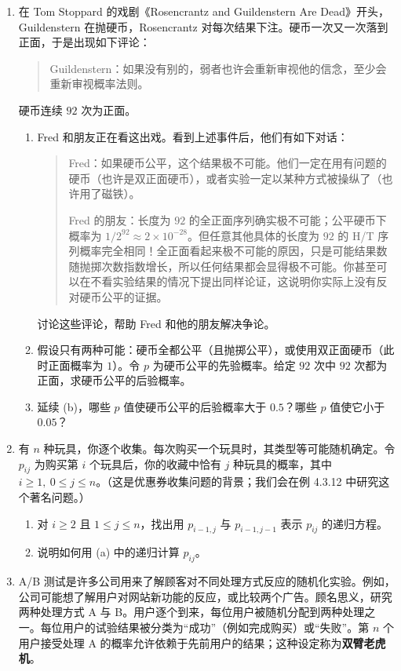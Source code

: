 \documentclass[UTF8, 12pt, fontset=fandol, oneside]{ctexart}
\begin{document}
\begin{enumerate}
  \item 在 Tom Stoppard 的戏剧《Rosencrantz and Guildenstern Are Dead》开头，Guildenstern 在抛硬币，Rosencrantz 对每次结果下注。硬币一次又一次落到正面，于是出现如下评论：
  \begin{quote}
  Guildenstern：如果没有别的，弱者也许会重新审视他的信念，至少会重新审视概率法则。
  \end{quote}
  硬币连续 $92$ 次为正面。
  \begin{enumerate}
    \item Fred 和朋友正在看这出戏。看到上述事件后，他们有如下对话：
    \begin{quote}
    Fred：如果硬币公平，这个结果极不可能。他们一定在用有问题的硬币（也许是双正面硬币），或者实验一定以某种方式被操纵了（也许用了磁铁）。

    Fred 的朋友：长度为 $92$ 的全正面序列确实极不可能；公平硬币下概率为 $1/2^{92}\approx 2\times 10^{-28}$。但任意其他具体的长度为 $92$ 的 H/T 序列概率完全相同！全正面看起来极不可能的原因，只是可能结果数随抛掷次数指数增长，所以任何结果都会显得极不可能。你甚至可以在不看实验结果的情况下提出同样论证，这说明你实际上没有反对硬币公平的证据。
    \end{quote}
    讨论这些评论，帮助 Fred 和他的朋友解决争论。
    \item 假设只有两种可能：硬币全都公平（且抛掷公平），或使用双正面硬币（此时正面概率为 $1$）。令 $p$ 为硬币公平的先验概率。给定 $92$ 次中 $92$ 次都为正面，求硬币公平的后验概率。
    \item 延续 (b)，哪些 $p$ 值使硬币公平的后验概率大于 $0.5$？哪些 $p$ 值使它小于 $0.05$？
  \end{enumerate}

  \item 有 $n$ 种玩具，你逐个收集。每次购买一个玩具时，其类型等可能随机确定。令 $p_{ij}$ 为购买第 $i$ 个玩具后，你的收藏中恰有 $j$ 种玩具的概率，其中 $i\ge 1,\ 0\le j\le n$。（这是优惠券收集问题的背景；我们会在例 4.3.12 中研究这个著名问题。）
  \begin{enumerate}
    \item 对 $i\ge 2$ 且 $1\le j\le n$，找出用 $p_{i-1,j}$ 与 $p_{i-1,j-1}$ 表示 $p_{ij}$ 的递归方程。
    \item 说明如何用 (a) 中的递归计算 $p_{ij}$。
  \end{enumerate}

  \item A/B 测试是许多公司用来了解顾客对不同处理方式反应的随机化实验。例如，公司可能想了解用户对网站新功能的反应，或比较两个广告。顾名思义，研究两种处理方式 A 与 B。用户逐个到来，每位用户被随机分配到两种处理之一。每位用户的试验结果被分类为“成功”（例如完成购买）或“失败”。第 $n$ 个用户接受处理 A 的概率允许依赖于先前用户的结果；这种设定称为\textbf{双臂老虎机}。


\end{enumerate}
\end{document}
